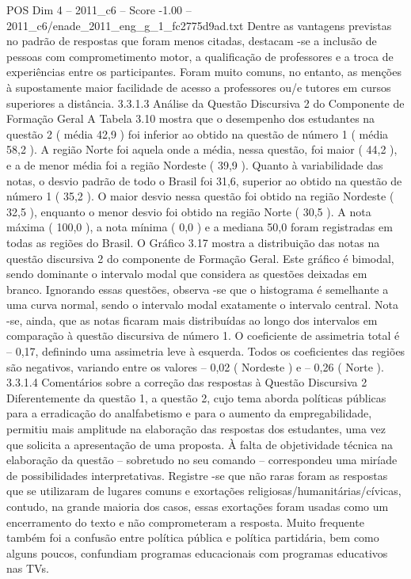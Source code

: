 \begin{textsample}{POS Dim 4 – 2011\_c6 – Score -1.00 – 2011\_c6/enade\_2011\_eng\_g\_1\_fc2775d9ad.txt}
Dentre as vantagens previstas no padrão de respostas que foram menos citadas, destacam -se a inclusão de pessoas com comprometimento motor, a qualificação de professores e a troca de experiências entre os participantes.
Foram muito comuns, no entanto, as menções à supostamente maior facilidade de acesso a professores ou/e tutores em cursos superiores a distância. 3.3.1.3 Análise da Questão Discursiva 2 do Componente de Formação Geral A Tabela 3.10 mostra que o desempenho dos estudantes na questão 2 ( média 42,9 ) foi inferior ao obtido na questão de número 1 ( média 58,2 ).
A região Norte foi aquela onde a média, nessa questão, foi maior ( 44,2 ), e a de menor média foi a região Nordeste ( 39,9 ).
Quanto à variabilidade das notas, o desvio padrão de todo o Brasil foi 31,6, superior ao obtido na questão de número 1 ( 35,2 ).
O maior desvio nessa questão foi obtido na região Nordeste ( 32,5 ), enquanto o menor desvio foi obtido na região Norte ( 30,5 ).
A nota máxima ( 100,0 ), a nota mínima ( 0,0 ) e a mediana 50,0 foram registradas em todas as regiões do Brasil.
O Gráfico 3.17 mostra a distribuição das notas na questão discursiva 2 do componente de Formação Geral.
Este gráfico é bimodal, sendo dominante o intervalo modal que considera as questões deixadas em branco.
Ignorando essas questões, observa -se que o histograma é semelhante a uma curva normal, sendo o intervalo modal exatamente o intervalo central.
Nota -se, ainda, que as notas ficaram mais distribuídas ao longo dos intervalos em comparação à questão discursiva de número 1.
O coeficiente de assimetria total é – 0,17, definindo uma assimetria leve à esquerda.
Todos os coeficientes das regiões são negativos, variando entre os valores – 0,02 ( Nordeste ) e – 0,26 ( Norte ). 3.3.1.4 Comentários sobre a correção das respostas à Questão Discursiva 2 Diferentemente da questão 1, a questão 2, cujo tema aborda políticas públicas para a erradicação do analfabetismo e para o aumento da empregabilidade, permitiu mais amplitude na elaboração das respostas dos estudantes, uma vez que solicita a apresentação de uma proposta.
À falta de objetividade técnica na elaboração da questão – sobretudo no seu comando – correspondeu uma miríade de possibilidades interpretativas.
Registre -se que não raras foram as respostas que se utilizaram de lugares comuns e exortações religiosas/humanitárias/cívicas, contudo, na grande maioria dos casos, essas exortações foram usadas como um encerramento do texto e não comprometeram a resposta.
Muito frequente também foi a confusão entre política pública e política partidária, bem como alguns poucos, confundiam programas educacionais com programas educativos nas TVs.

\end{textsample}
